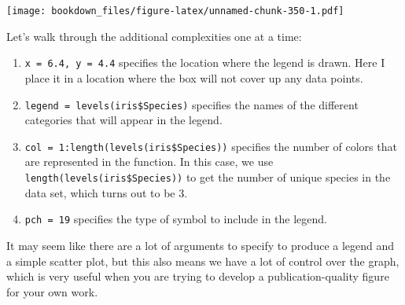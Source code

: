 \documentclass[
]{krantz}
\makeatletter
\newenvironment{Shaded}{\begin{snugshade}}{\end{snugshade}}
\newcommand{\DataTypeTok}[1]{\textcolor[rgb]{0.27,0.27,0.27}{#1}}
\newcommand{\DecValTok}[1]{\textcolor[rgb]{0.06,0.06,0.06}{#1}}
\newcommand{\FloatTok}[1]{\textcolor[rgb]{0.06,0.06,0.06}{#1}}
\newcommand{\KeywordTok}[1]{\textcolor[rgb]{0.27,0.27,0.27}{\textbf{#1}}}
\newcommand{\NormalTok}[1]{#1}
\newcommand{\OperatorTok}[1]{\textcolor[rgb]{0.43,0.43,0.43}{\textbf{#1}}}
\newcommand{\StringTok}[1]{\textcolor[rgb]{0.5,0.5,0.5}{#1}}
\providecommand{\tightlist}{%
  \setlength{\itemsep}{0pt}\setlength{\parskip}{0pt}}
\newenvironment{kframe}{%
\medskip{}
\setlength{\fboxsep}{.8em}
 \def\at@end@of@kframe{}%
 \ifinner\ifhmode%
  \def\at@end@of@kframe{\end{minipage}}%
  \begin{minipage}{\columnwidth}%
 \fi\fi%
 \def\FrameCommand##1{\hskip\@totalleftmargin \hskip-\fboxsep
 \colorbox{shadecolor}{##1}\hskip-\fboxsep
     \hskip-\linewidth \hskip-\@totalleftmargin \hskip\columnwidth}%
 \MakeFramed {\advance\hsize-\width
   \@totalleftmargin\z@ \linewidth\hsize
   \@setminipage}}%
 {\par\unskip\endMakeFramed%
 \at@end@of@kframe}
\renewenvironment{Shaded}{\begin{kframe}}{\end{kframe}}
\makeatother
\begin{document}
\begin{Shaded}
\end{Shaded}

\texttt{[image: bookdown\_files/figure-latex/unnamed-chunk-350-1.pdf]}

Let's walk through the additional complexities one at a time:

\begin{enumerate}
\def\labelenumi{\arabic{enumi}.}
\tightlist
\item
  \texttt{x\ =\ 6.4,\ y\ =\ 4.4} specifies the location where the legend is drawn. Here I place it in a location where the box will not cover up any data points.
\item
  \texttt{legend\ =\ levels(iris\$Species)} specifies the names of the different categories that will appear in the legend.
\item
  \texttt{col\ =\ 1:length(levels(iris\$Species))} specifies the number of colors that are represented in the function. In this case, we use \texttt{length(levels(iris\$Species))} to get the number of unique species in the data set, which turns out to be 3.
\item
  \texttt{pch\ =\ 19} specifies the type of symbol to include in the legend.
\end{enumerate}

It may seem like there are a lot of arguments to specify to produce a legend and a simple scatter plot, but this also means we have a lot of control over the graph, which is very useful when you are trying to develop a publication-quality figure for your own work.
\end{document}
